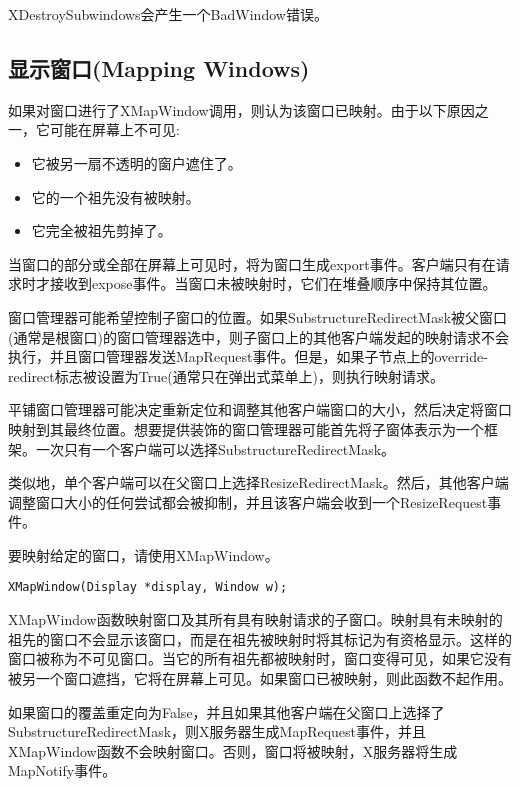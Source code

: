 \noindent XDestroySubwindows会产生一个BadWindow错误。

\subsection{显示窗口(Mapping Windows)}

\noindent 如果对窗口进行了XMapWindow调用，则认为该窗口已映射。由于以下原因之一，它可能在屏幕上不可见:

\begin{itemize}
	\item 它被另一扇不透明的窗户遮住了。
	\item 它的一个祖先没有被映射。
	\item 它完全被祖先剪掉了。
\end{itemize}

当窗口的部分或全部在屏幕上可见时，将为窗口生成export事件。客户端只有在请求时才接收到expose事件。当窗口未被映射时，它们在堆叠顺序中保持其位置。

窗口管理器可能希望控制子窗口的位置。如果SubstructureRedirectMask被父窗口(通常是根窗口)的窗口管理器选中，则子窗口上的其他客户端发起的映射请求不会执行，并且窗口管理器发送MapRequest事件。但是，如果子节点上的override-redirect标志被设置为True(通常只在弹出式菜单上)，则执行映射请求。

平铺窗口管理器可能决定重新定位和调整其他客户端窗口的大小，然后决定将窗口映射到其最终位置。想要提供装饰的窗口管理器可能首先将子窗体表示为一个框架。一次只有一个客户端可以选择SubstructureRedirectMask。

类似地，单个客户端可以在父窗口上选择ResizeRedirectMask。然后，其他客户端调整窗口大小的任何尝试都会被抑制，并且该客户端会收到一个ResizeRequest事件。

要映射给定的窗口，请使用XMapWindow。

\begin{lstlisting}
XMapWindow(Display *display, Window w);
\end{lstlisting}

XMapWindow函数映射窗口及其所有具有映射请求的子窗口。映射具有未映射的祖先的窗口不会显示该窗口，而是在祖先被映射时将其标记为有资格显示。这样的窗口被称为不可见窗口。当它的所有祖先都被映射时，窗口变得可见，如果它没有被另一个窗口遮挡，它将在屏幕上可见。如果窗口已被映射，则此函数不起作用。

如果窗口的覆盖重定向为False，并且如果其他客户端在父窗口上选择了SubstructureRedirectMask，则X服务器生成MapRequest事件，并且XMapWindow函数不会映射窗口。否则，窗口将被映射，X服务器将生成MapNotify事件。

